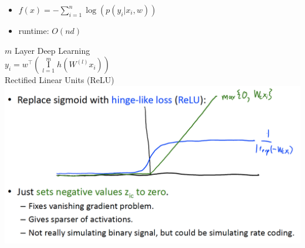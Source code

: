 \documentclass[10pt,landscape,a4paper]{article}
\DeclareMathOperator*{\composition}{I}
\begin{document}
\begin{multicols*}{5}
\begin{itemize}
    \item \(f(x) = - \sum_{i=1}^{n}\log{(p(y_i|x_i,w))}\)
    \item runtime: \(O(nd)\)
\end{itemize}
\(m\) Layer Deep Learning \\
$y_i = w^\intercal (\composition\limits_{l=1}^{m} h(W^{(l)} x_i))$ \\
Rectified Linear Units (ReLU)
\includegraphics[scale=0.15]{relu}


\end{multicols*}
\end{document}
